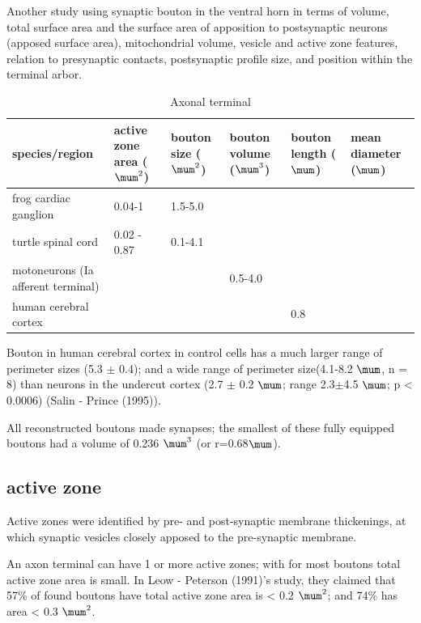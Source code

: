 Another study using synaptic bouton in the ventral horn in terms of volume,
total surface area and the surface area of apposition to postsynaptic neurons
(apposed surface area), mitochondrial volume, vesicle and active zone features,
relation to presynaptic contacts, postsynaptic profile size, and position within
the terminal arbor.

\begin{table}[hbt]
\small{
\begin{center}
\caption{Axonal terminal}
\begin{tabular}{p{2cm}|p{2cm}p{2cm}p{2cm}p{2cm}p{2cm}} 
  \hline
species/region  & active zone area ($\mum^2$) & bouton size ($\mum^2$) & bouton
volume ($\mum^3$) & bouton length ($\mum$) & mean diameter ($\mum$) \\
  \hline\hline
frog cardiac ganglion & 0.04-1 & 1.5-5.0 & \\
turtle spinal cord & 0.02 - 0.87 & 0.1-4.1 & \\
motoneurons (Ia afferent terminal) & & & 0.5-4.0 \\ 
human cerebral cortex & & & & 0.8 \\
\end{tabular}
\end{center}
\label{tab:axonal-terminal}
}
\end{table}

Bouton in human cerebral cortex in control cells has a much larger range of
perimeter sizes (5.3 $\pm$ 0.4); and a wide range of perimeter size(4.1-8.2
$\mum$, n = 8) than neurons in the undercut cortex (2.7 $\pm$ 0.2 $\mum$; range
2.3$\pm$4.5 $\mum$; p < 0.0006) (Salin - Prince (1995)).

All reconstructed boutons made synapses; the smallest of these fully equipped
boutons had a volume of 0.236 $\mum^3$ (or r=0.68$\mum$). 

\subsection{active zone}
\label{sec:active-zone}

Active zones were identified by pre- and post-synaptic membrane thickenings, at
which synaptic vesicles closely apposed to the pre-synaptic membrane.

An axon terminal can have 1 or more active zones; with for most boutons total
active zone area is small.
In Leow - Peterson (1991)'s study, they claimed that 57\% of found boutons have
total active zone area is < 0.2 $\mum^2$; and 74\% has area < 0.3 $\mum^2$.

